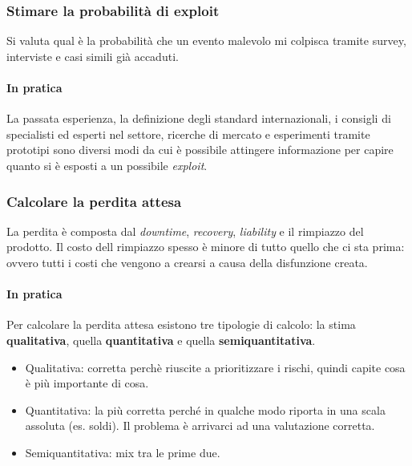 \subsubsection{Stimare la probabilità di exploit}

Si valuta qual è la probabilità che un evento malevolo mi colpisca tramite
survey, interviste e casi simili già accaduti.

\paragraph*{In pratica}

La passata esperienza, la definizione degli standard internazionali, i consigli
di specialisti ed esperti nel settore, ricerche di mercato e esperimenti
tramite prototipi sono diversi modi da cui \`e possibile attingere
informazione per capire quanto si \`e esposti a un possibile \textit{exploit}.



\subsubsection{Calcolare la perdita attesa}

La perdita è composta dal \textit{downtime}, \textit{recovery},
\textit{liability} e il rimpiazzo del prodotto. Il costo dell rimpiazzo spesso è
minore di tutto quello che ci sta prima: ovvero tutti i costi che vengono a
crearsi a causa della disfunzione creata.

\paragraph*{In pratica}

Per calcolare la perdita attesa esistono tre tipologie di calcolo: la stima
\textbf{qualitativa}, quella \textbf{quantitativa} e quella
\textbf{semiquantitativa}.

\begin{itemize}
\item Qualitativa: corretta perchè riuscite a prioritizzare i rischi, quindi
capite cosa è più importante di cosa.
\item Quantitativa: la più corretta perché in qualche modo riporta in una scala
assoluta (es. soldi). Il problema è arrivarci ad una valutazione corretta.
\item Semiquantitativa: mix tra le prime due.
\end{itemize}

